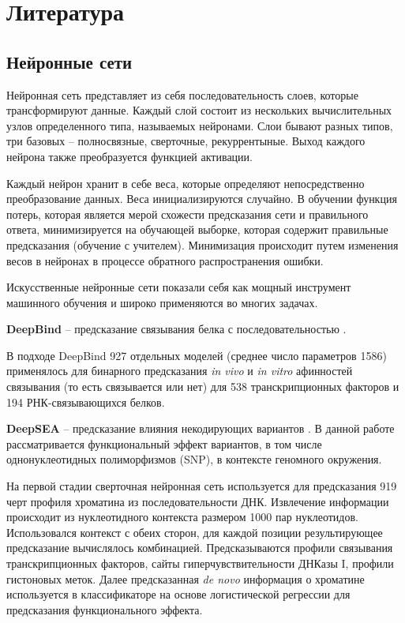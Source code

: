 \section{Литература}
\subsection{Нейронные сети}
Нейронная сеть представляет из себя последовательность слоев, которые трансформируют данные. Каждый слой состоит из нескольких вычислительных узлов определенного типа, называемых нейронами. Слои бывают разных типов, три базовых  -- полносвязные, сверточные, рекуррентыные. Выход каждого нейрона также преобразуется функцией активации.

Каждый нейрон хранит в себе веса, которые определяют непосредственно преобразование данных. Веса инициализируются случайно.
В обучении функция потерь, которая является мерой схожести предсказания сети и правильного ответа, минимизируется на обучающей выборке, которая содержит правильные предсказания (обучение с учителем). Минимизация происходит путем изменения весов в нейронах в процессе обратного распространения ошибки.

Искусственные нейронные сети показали себя как мощный инструмент машинного обучения и широко применяются во многих задачах.

{\bfseries DeepBind} -- предсказание связывания белка с последовательностью \cite{alipanahi_predicting_2015}.

В подходе DeepBind 927 отдельных моделей (среднее число параметров 1586) применялось для бинарного предсказания \emph{in vivo} и \emph{in vitro} афинностей связывания (то есть связывается или нет) для 538 транскрипционных факторов и 194 РНК-связывающихся белков.


{\bfseries DeepSEA} -- предсказание влияния некодирующих вариантов \cite{zhou_predicting_2015}.
 В данной работе рассматривается функциональный эффект вариантов, в том числе однонуклеотидных полиморфизмов (SNP), в контексте геномного окружения. 

На первой стадии сверточная нейронная сеть используется для предсказания 919 черт профиля хроматина из последовательности ДНК. Извлечение  информации происходит из нуклеотидного контекста размером 1000 пар нуклеотидов. Использовался контекст с обеих сторон, для каждой позиции результирующее предсказание вычислялось комбинацией. Предсказываются профили связывания транскрипционных факторов, сайты гиперчувствительности ДНКазы I, профили гистоновых меток. Далее предсказанная \emph{de novo} информация о хроматине используется в классификаторе на основе логистической регрессии для предсказания функционального эффекта.

